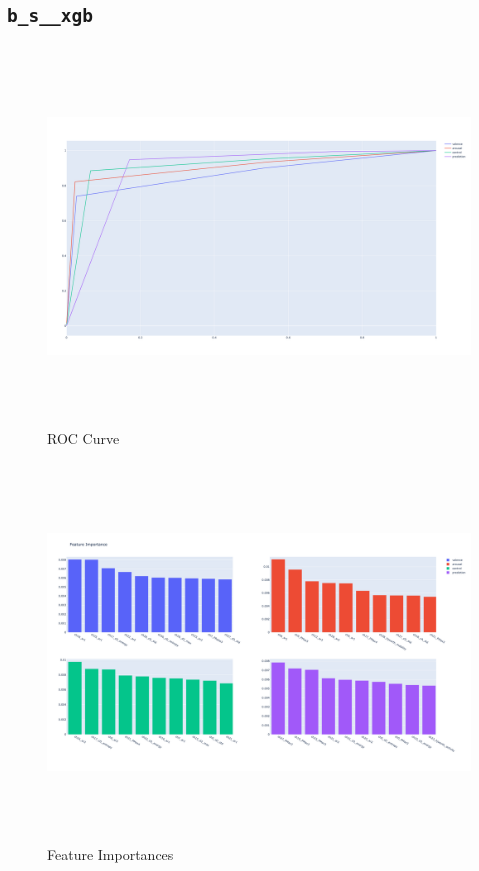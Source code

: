 \subsection{\texttt{b\_s\_\_xgb}}
\begin{figure}[H]
\centering
\hspace*{-1.5cm}
\includegraphics[height=10cm]{Figures/res_roc__b_s_xgb.png}
\caption{ROC Curve}
\label{fig23}
\end{figure}

\begin{figure}[H]
\centering
\hspace*{-1.5cm}
\includegraphics[height=10cm]{Figures/res_feature_importance__b_s_xgb.png}
\caption{Feature Importances}
\label{fig23}
\end{figure}

